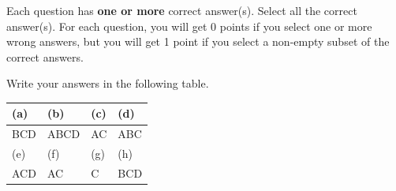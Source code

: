 
Each question has \textbf{one or more} correct answer(s). Select all the correct answer(s). For each question, you will get 0 points if you select one or more wrong answers, but you will get 1 point if you select a non-empty subset of the correct answers.

Write your answers in the following table.


\begin{table}[htbp]
    \centering
    \begin{tabular}{|p{2cm}|p{2cm}|p{2cm}|p{2cm}|}
        \hline
        (a) & (b) & (c) & (d) \\
        \hline
           BCD & ABCD & AC & ABC  \\
        \hline
        (e) & (f) & (g) & (h) \\
        \hline
          ACD  & AC & C &  BCD \\
        \hline
    \end{tabular}
\end{table}


